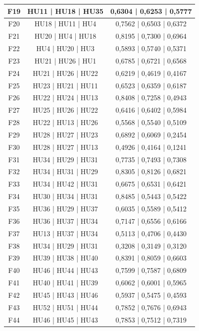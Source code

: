 \documentclass{prgrado}
\begin{document}
\begin{longtable}{|c|c|c|}
F19 & HU11 | HU18 | HU35 & 0,6304 | 0,6253 | 0,5777 \\ \hline
F20 & HU18 | HU11 | HU4 & 0,7562 | 0,6503 | 0,6372 \\ \hline
F21 & HU20 | HU4 | HU18 & 0,8195 | 0,7300 | 0,6964 \\ \hline
F22 & HU4 | HU20 | HU3 & 0,5893 | 0,5740 | 0,5371 \\ \hline
F23 & HU21 | HU26 | HU1 & 0,6785 | 0,6721 | 0,6568 \\ \hline
F24 & HU21 | HU26 | HU22 & 0,6219 | 0,4619 | 0,4167 \\ \hline
F25 & HU23 | HU21 | HU11 & 0,6523 | 0,6359 | 0,6187 \\ \hline
F26 & HU22 | HU24 | HU13 & 0,8408 | 0,7258 | 0,4943 \\ \hline
F27 & HU25 | HU26 | HU22 & 0,6416 | 0,6402 | 0,5984 \\ \hline
F28 & HU22 | HU13 | HU26 & 0,5568 | 0,5540 | 0,5109 \\ \hline
F29 & HU28 | HU27 | HU23 & 0,6892 | 0,6069 | 0,2454 \\ \hline
F30 & HU28 | HU27 | HU13 & 0,4926 | 0,4164 | 0,1241 \\ \hline
F31 & HU34 | HU29 | HU31 & 0,7735 | 0,7493 | 0,7308 \\ \hline
F32 & HU34 | HU31 | HU29 & 0,8305 | 0,8126 | 0,6821 \\ \hline
F33 & HU34 | HU42 | HU31 & 0,6675 | 0,6531 | 0,6421 \\ \hline
F34 & HU30 | HU34 | HU31 & 0,8485 | 0,5443 | 0,5422 \\ \hline
F35 & HU36 | HU29 | HU37 & 0,6035 | 0,5589 | 0,5412 \\ \hline
F36 & HU36 | HU37 | HU34 & 0,7147 | 0,6556 | 0,6166 \\ \hline
F37 & HU13 | HU37 | HU34 & 0,5113 | 0,4706 | 0,4430 \\ \hline
F38 & HU34 | HU29 | HU31 & 0,3208 | 0,3149 | 0,3120 \\ \hline
F39 & HU39 | HU38 | HU40 & 0,8391 | 0,8059 | 0,6603 \\ \hline
F40 & HU46 | HU44 | HU43 & 0,7599 | 0,7587 | 0,6809 \\ \hline
F41 & HU40 | HU41 | HU39 & 0,6062 | 0,6001 | 0,5965 \\ \hline
F42 & HU45 | HU43 | HU46 & 0,5937 | 0,5475 | 0,4593 \\ \hline
F43 & HU52 | HU51 | HU44 & 0,7852 | 0,7676 | 0,6943 \\ \hline
F44 & HU46 | HU45 | HU43 & 0,7853 | 0,7512 | 0,7319 \\ \hline

\end{longtable}
\end{document}
